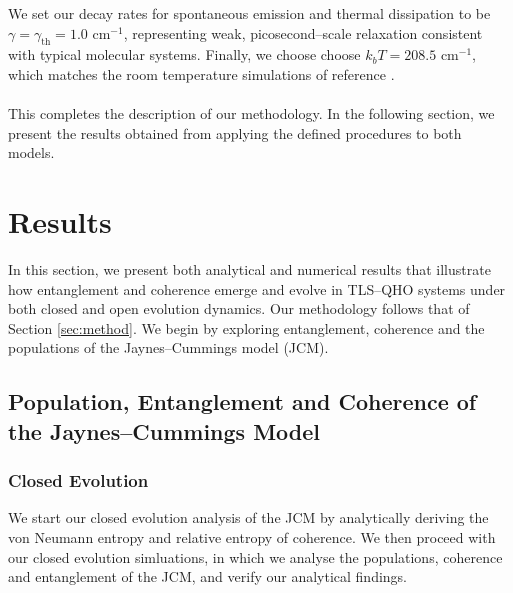 \documentclass[11pt]{article}
\newcounter{subsubsubsection}[subsubsection]
\begin{document}
We set our decay rates for spontaneous emission and thermal dissipation to be $\gamma = \gamma_{\scriptscriptstyle\text{th}} = 1.0 \text{ cm}^{-1}$, representing weak, picosecond--scale relaxation consistent with typical molecular systems. Finally, we choose choose $k_bT = 208.5 \text{ cm}^{-1}$, which matches the room temperature simulations of reference \cite{ExVib2014-Alexandra}.\\
\\
This completes the description of our methodology. In the following section, we present the results obtained from applying the defined procedures to both models.

\newpage
\section{Results} \label{sec:results}
In this section, we present both analytical and numerical results that illustrate how entanglement and coherence emerge and evolve in TLS--QHO systems under both closed and open evolution dynamics. Our methodology follows that of Section \ref{sec:method}. We begin by exploring entanglement, coherence and the populations of the Jaynes--Cummings model (JCM). 

\subsection{Population, Entanglement and Coherence of the Jaynes--Cummings Model}  \label{sec:results_JCM}
\subsubsection{Closed Evolution}

We start our closed evolution analysis of the JCM by analytically deriving the von Neumann entropy and relative entropy of coherence. We then proceed with our closed evolution simluations, in which we analyse the populations, coherence and entanglement of the JCM, and verify our analytical findings.

\end{document}
